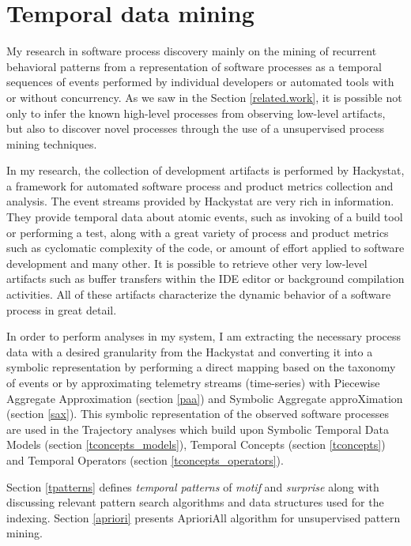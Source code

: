 \section{Temporal data mining} \label{methods}
My research in software process discovery mainly on the mining of recurrent behavioral patterns from a representation of software processes as a temporal sequences of events performed by individual developers or automated tools with or without concurrency. As we saw in the Section \ref{related.work}, it is possible not only to infer the known high-level processes from observing low-level artifacts, but also to discover novel processes through the use of a unsupervised process mining techniques.

In my research, the collection of development artifacts is performed by Hackystat, a framework for automated software process and product metrics collection and analysis. The event streams provided by Hackystat are very rich in information. They provide temporal data about atomic events, such as invoking of a build tool or performing a test, along with a great variety of process and product metrics such as cyclomatic complexity of the code, or amount of effort applied to software development and many other. It is possible to retrieve other very low-level artifacts such as buffer transfers within the IDE editor or background compilation activities. All of these artifacts characterize the dynamic behavior of a software process in great detail.

In order to perform analyses in my system, I am extracting the necessary process data with a desired granularity from the Hackystat and converting it into a symbolic representation by performing a direct mapping based on the taxonomy of events or by approximating telemetry streams (time-series) with Piecewise Aggregate Approximation (section \ref{paa}) and Symbolic Aggregate approXimation (section \ref{sax}). This symbolic representation of the observed software processes are used in the Trajectory analyses which build upon Symbolic Temporal Data Models (section \ref{tconcepts_models}), Temporal Concepts (section \ref{tconcepts}) and Temporal Operators (section \ref{tconcepts_operators}). 

Section \ref{tpatterns} defines \textit{temporal patterns} of \textit{motif} and \textit{surprise} along with discussing relevant pattern search algorithms and data structures used for the indexing. Section \ref{apriori} presents AprioriAll algorithm for unsupervised pattern mining.